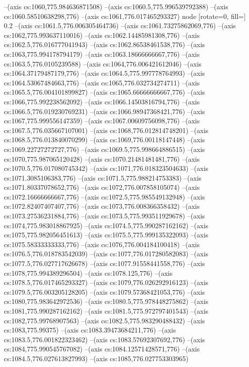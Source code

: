 --(axis cs:1060,775.984636871508)
--(axis cs:1060.5,775.996539792388)
--(axis cs:1060.58510638298,776)
--(axis cs:1061,776.017465293327) node [rotate=0, fill=\bgcol] {0.2}
--(axis cs:1061.5,776.006305464736)
--(axis cs:1061.73275862069,776)
--(axis cs:1062,775.993637110016)
--(axis cs:1062.14485981308,776)
--(axis cs:1062.5,776.016777041943)
--(axis cs:1062.86538461538,776)
--(axis cs:1063,775.994178794179)
--(axis cs:1063.18666666667,776)
--(axis cs:1063.5,776.0105239588)
--(axis cs:1064,776.006421612046)
--(axis cs:1064.37179487179,776)
--(axis cs:1064.5,775.997778764993)
--(axis cs:1064.53067484663,776)
--(axis cs:1065,776.032734274711)
--(axis cs:1065.5,776.004101899827)
--(axis cs:1065.66666666667,776)
--(axis cs:1066,775.992238562092)
--(axis cs:1066.14503816794,776)
--(axis cs:1066.5,776.019230769231)
--(axis cs:1066.98947368421,776)
--(axis cs:1067,775.999556147359)
--(axis cs:1067.00609756098,776)
--(axis cs:1067.5,776.035667107001)
--(axis cs:1068,776.012814748201)
--(axis cs:1068.5,776.013840070299)
--(axis cs:1069,776.00118147448)
--(axis cs:1069.22727272727,776)
--(axis cs:1069.5,775.998664886515)
--(axis cs:1070,775.987065120428)
--(axis cs:1070.21481481481,776)
--(axis cs:1070.5,776.017080745342)
--(axis cs:1071,776.018323504633)
--(axis cs:1071.3085106383,776)
--(axis cs:1071.5,775.988214753383)
--(axis cs:1071.80337078652,776)
--(axis cs:1072,776.007858105074)
--(axis cs:1072.16666666667,776)
--(axis cs:1072.5,775.985549132948)
--(axis cs:1072.82407407407,776)
--(axis cs:1073,776.008366358432)
--(axis cs:1073.27536231884,776)
--(axis cs:1073.5,775.993511929678)
--(axis cs:1074,775.983018867925)
--(axis cs:1074.5,775.990287162162)
--(axis cs:1075,775.982056451613)
--(axis cs:1075.5,775.999135322093)
--(axis cs:1075.58333333333,776)
--(axis cs:1076,776.004184100418)
--(axis cs:1076.5,776.018783542039)
--(axis cs:1077,776.017280582083)
--(axis cs:1077.5,776.027717626678)
--(axis cs:1077.91558441558,776)
--(axis cs:1078,775.994389296504)
--(axis cs:1078.125,776)
--(axis cs:1078.5,776.017465293327)
--(axis cs:1079,776.026292916123)
--(axis cs:1079.5,776.003205128205)
--(axis cs:1079.57368421053,776)
--(axis cs:1080,775.983642972536)
--(axis cs:1080.5,775.978448275862)
--(axis cs:1081,775.990287162162)
--(axis cs:1081.5,775.972797401543)
--(axis cs:1082,775.99768907563)
--(axis cs:1082.5,775.983290488432)
--(axis cs:1083,775.99375)
--(axis cs:1083.39473684211,776)
--(axis cs:1083.5,776.001822323462)
--(axis cs:1083.57692307692,776)
--(axis cs:1084,775.990545767082)
--(axis cs:1084.12571428571,776)
--(axis cs:1084.5,776.027613827993)
--(axis cs:1085,776.027753303965)
